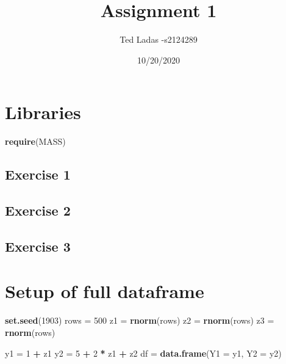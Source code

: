 \documentclass[
]{article}
\title{Assignment 1}
\author{Ted Ladas -s2124289}
\date{10/20/2020}
\newenvironment{Shaded}{\begin{snugshade}}{\end{snugshade}}
\newcommand{\DataTypeTok}[1]{\textcolor[rgb]{0.13,0.29,0.53}{#1}}
\newcommand{\DecValTok}[1]{\textcolor[rgb]{0.00,0.00,0.81}{#1}}
\newcommand{\KeywordTok}[1]{\textcolor[rgb]{0.13,0.29,0.53}{\textbf{#1}}}
\newcommand{\NormalTok}[1]{#1}
\newcommand{\OperatorTok}[1]{\textcolor[rgb]{0.81,0.36,0.00}{\textbf{#1}}}
\newcommand{\StringTok}[1]{\textcolor[rgb]{0.31,0.60,0.02}{#1}}
\begin{document}
\maketitle

\hypertarget{libraries}{%
\section{Libraries}\label{libraries}}

\begin{Shaded}
\begin{Highlighting}[]
\KeywordTok{require}\NormalTok{(MASS)}
\end{Highlighting}
\end{Shaded}

\hypertarget{exercise-1}{%
\subsection{Exercise 1}\label{exercise-1}}

\hypertarget{exercise-2}{%
\subsection{Exercise 2}\label{exercise-2}}

\hypertarget{exercise-3}{%
\subsection{Exercise 3}\label{exercise-3}}

\hypertarget{setup-of-full-dataframe}{%
\section{Setup of full dataframe}\label{setup-of-full-dataframe}}

\begin{Shaded}
\begin{Highlighting}[]
\KeywordTok{set.seed}\NormalTok{(}\DecValTok{1903}\NormalTok{)}
\NormalTok{rows =}\StringTok{ }\DecValTok{500}
\NormalTok{z1 =}\StringTok{ }\KeywordTok{rnorm}\NormalTok{(rows)}
\NormalTok{z2 =}\StringTok{ }\KeywordTok{rnorm}\NormalTok{(rows)}
\NormalTok{z3 =}\StringTok{ }\KeywordTok{rnorm}\NormalTok{(rows)}

\NormalTok{y1 =}\StringTok{ }\DecValTok{1} \OperatorTok{+}\StringTok{ }\NormalTok{z1}
\NormalTok{y2 =}\StringTok{ }\DecValTok{5} \OperatorTok{+}\StringTok{ }\DecValTok{2} \OperatorTok{*}\StringTok{ }\NormalTok{z1 }\OperatorTok{+}\StringTok{ }\NormalTok{z2}
\NormalTok{df =}\StringTok{ }\KeywordTok{data.frame}\NormalTok{(}\DataTypeTok{Y1 =}\NormalTok{ y1, }\DataTypeTok{Y2 =}\NormalTok{ y2)}
\end{Highlighting}
\end{Shaded}
\end{document}
